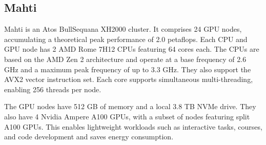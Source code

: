
\subsection{Mahti}

Mahti \cite{mahti} is an Atos BullSequana XH2000 cluster. It comprises 24 GPU nodes, accumulating a theoretical peak performance of 2.0 petaflops. Each CPU and GPU node has 2 AMD Rome 7H12 CPUs featuring 64 cores each. The CPUs are based on the AMD Zen 2 architecture and operate at a base frequency of 2.6 GHz and a maximum peak frequency of up to 3.3 GHz. They also support the AVX2 vector instruction set. Each core supports simultaneous multi-threading, enabling 256 threads per node.

The GPU nodes have 512 GB of memory and a local 3.8 TB NVMe drive. They also have 4 Nvidia Ampere A100 GPUs, with a subset of nodes featuring split A100 GPUs. This enables lightweight workloads such as interactive tasks, courses, and code development and saves energy consumption.




